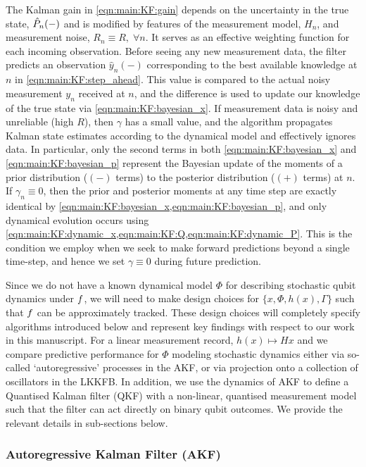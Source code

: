 The Kalman gain in \cref{eqn:main:KF:gain} depends on the uncertainty in the true state, $\hat{P}_{n}(-)$ and is modified by features of the measurement model, $H_n$, and measurement noise, $R_n \equiv R,\; \forall n$. It serves as an effective weighting function for each incoming observation.  Before seeing any new measurement data, the filter predicts an observation $\hat{y}_n(-)$ corresponding to the best available knowledge at $n$ in \cref{eqn:main:KF:step_ahead}. This value is compared to the actual noisy measurement $y_n$ received at $n$, and the difference is used to update our knowledge of the true state via \cref{eqn:main:KF:bayesian_x}. If measurement data is noisy and unreliable (high $R$), then $\gamma$ has a small value, and the algorithm propagates Kalman state estimates according to the dynamical model and effectively ignores data. In particular, only the second terms in both \cref{eqn:main:KF:bayesian_x} and \cref{eqn:main:KF:bayesian_p} represent the Bayesian update of the moments of a prior distribution ($(-)$ terms) to the posterior distribution ($(+)$ terms) at $n$. If $\gamma_n \equiv 0$, then the prior and posterior moments at any time step are exactly identical by \cref{eqn:main:KF:bayesian_x,eqn:main:KF:bayesian_p}, and only dynamical evolution occurs using \cref{eqn:main:KF:dynamic_x,eqn:main:KF:Q,eqn:main:KF:dynamic_P}.  This is the condition we employ when we seek to make forward predictions beyond a single time-step, and hence we set $\gamma \equiv 0$ during future prediction.

Since we do not have a known dynamical model $\Phi$ for describing stochastic qubit dynamics under $f$, we will need to make design choices for  $\{ x, \Phi, h(x), \Gamma \}$  such that $f$ can be approximately tracked. These design choices will completely specify algorithms introduced below and represent key findings with respect to our work in this manuscript. For a linear measurement record, $h(x) \mapsto Hx$ and we compare predictive performance for $\Phi$ modeling stochastic dynamics either via so-called `autoregressive' processes in the AKF, or via projection onto a collection of oscillators in the LKKFB.  In addition, we use the dynamics of AKF to define a Quantised Kalman filter (QKF) with a non-linear, quantised measurement model such that the filter can act directly on binary qubit outcomes. We provide the relevant details in sub-sections below. 



\subsubsection{Autoregressive Kalman Filter (AKF)}


